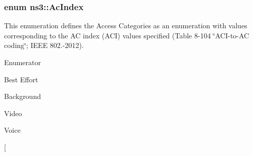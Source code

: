 \subsubsection[{\texorpdfstring{Ac\+Index}{AcIndex}}]{\setlength{\rightskip}{0pt plus 5cm}enum {\bf ns3\+::\+Ac\+Index}}\hypertarget{group__wifi_gab422b4562ba272b39a9b6bca3513f3ac}{}\label{group__wifi_gab422b4562ba272b39a9b6bca3513f3ac}
This enumeration defines the Access Categories as an enumeration with values corresponding to the AC index (A\+CI) values specified (Table 8-\/104 \char`\"{}\+A\+C\+I-\/to-\/\+A\+C coding\char`\"{}; I\+E\+EE 802.-\/2012). \begin{Desc}
\item[Enumerator]\par
\begin{description}
\item[{\em 
A\+C\+\_\+\+BE\hypertarget{group__wifi_ggab422b4562ba272b39a9b6bca3513f3aca136016fc12611734060b599355503c29}{}\label{group__wifi_ggab422b4562ba272b39a9b6bca3513f3aca136016fc12611734060b599355503c29}
}]Best Effort \item[{\em 
A\+C\+\_\+\+BK\hypertarget{group__wifi_ggab422b4562ba272b39a9b6bca3513f3aca53e99420c645076e74307112d73eb38b}{}\label{group__wifi_ggab422b4562ba272b39a9b6bca3513f3aca53e99420c645076e74307112d73eb38b}
}]Background \item[{\em 
A\+C\+\_\+\+VI\hypertarget{group__wifi_ggab422b4562ba272b39a9b6bca3513f3aca1c60bd99c5ede59bb50b91182cb81d0f}{}\label{group__wifi_ggab422b4562ba272b39a9b6bca3513f3aca1c60bd99c5ede59bb50b91182cb81d0f}
}]Video \item[{\em 
A\+C\+\_\+\+VO\hypertarget{group__wifi_ggab422b4562ba272b39a9b6bca3513f3aca147b7f007ca5459e52ee93d1ebe83639}{}\label{group__wifi_ggab422b4562ba272b39a9b6bca3513f3aca147b7f007ca5459e52ee93d1ebe83639}
}]Voice \item[{\em 
}
\end{description}
\end{Desc}
